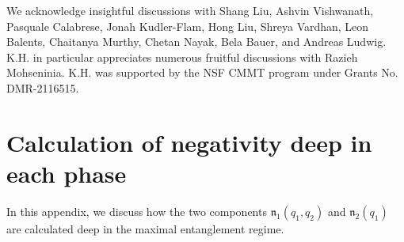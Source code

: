 \documentclass[aps,pra,reprint,superscriptaddress,twocolumn,notitlepage]{revtex4-1}
\numberwithin{equation}{section}
\renewcommand\theequation{\arabic{section}.\arabic{equation}}
\begin{document}
\acknowledgements

We acknowledge insightful discussions with Shang Liu, Ashvin Vishwanath, Pasquale Calabrese, Jonah Kudler-Flam, Hong Liu, Shreya Vardhan, Leon Balents, Chaitanya Murthy, Chetan Nayak, Bela Bauer, and Andreas Ludwig. K.H. in particular appreciates numerous fruitful discussions with Razieh Mohseninia.
K.H. was supported by the NSF CMMT program under Grants No. DMR-2116515.


\appendix



\section{Calculation of negativity deep in each phase}\label{app:negtivity_integration}

\renewcommand\theequation{B\arabic{equation}}


In this appendix, we discuss how the two components $\mathfrak{n}_1(q_1,q_2)$ and $\mathfrak{n}_2(q_1)$ are calculated deep in the maximal entanglement regime.
\end{document}
